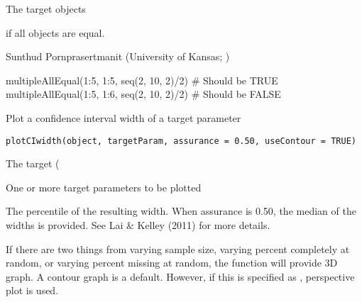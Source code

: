 \documentclass[a4paper]{book}
\begin{document}
%
\begin{Arguments}
\begin{ldescription}
\item[\code{...}] 
The target objects 

\end{ldescription}
\end{Arguments}
%
\begin{Value}
 if all objects are equal.
\end{Value}
%
\begin{Author}\relax
Sunthud Pornprasertmanit (University of Kansas; )
\end{Author}
%
\begin{Examples}
\begin{ExampleCode}
multipleAllEqual(1:5, 1:5, seq(2, 10, 2)/2) # Should be TRUE
multipleAllEqual(1:5, 1:6, seq(2, 10, 2)/2) # Should be FALSE
\end{ExampleCode}
\end{Examples}
%
\begin{Description}\relax
Plot a confidence interval width of a target parameter
\end{Description}
%
\begin{Usage}
\begin{verbatim}
plotCIwidth(object, targetParam, assurance = 0.50, useContour = TRUE)
\end{verbatim}
\end{Usage}
%
\begin{Arguments}
\begin{ldescription}
\item[\code{object}] 
The target ( 

\item[\code{targetParam}] 
One or more target parameters to be plotted

\item[\code{assurance}] 
The percentile of the resulting width. When assurance is 0.50, the median of the widths is provided. See Lai \& Kelley (2011) for more details.

\item[\code{useContour}] 
If there are two things from varying sample size, varying percent completely at random, or varying percent missing at random, the  function will provide 3D graph. A contour graph is a default. However, if this is specified as , perspective plot is used.

\end{ldescription}
\end{Arguments}
\end{document}
